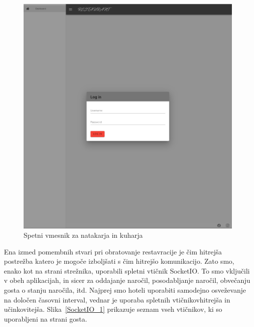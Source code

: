 \documentclass[a4paper, 12pt]{book}
\begin{document}
\begin{figure}[!htb]
\begin{center}
\includegraphics[width=12cm]{natakar-gost_1.jpg}
\caption{Spetni vmesnik za natakarja in kuharja}
\label{NatakarGost}
\end{center}
\end{figure}


Ena izmed pomembnih stvari pri obratovanje restavracije je čim hitrejša postrežba katero je mogoče izboljšati s čim hitrejšo komunikacijo. Zato smo, enako kot na strani strežnika, uporabili spletni vtičnik SocketIO. To smo vključili v obeh aplikacijah, in sicer za oddajanje naročil, posodabljanje naročil, obvečanju gosta o stanju naročila, itd. Najprej smo hoteli uporabiti samodejno osveževanje na določen časovni interval, vednar je uporaba spletnih vtičnikovhitrejša in učinkovitejša. Slika~\ref{SocketIO_1} prikazuje seznam vseh vtičnikov, ki so uporabljeni na strani gosta.
\end{document}
